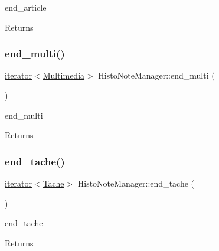 end\+\_\+article 

\begin{DoxyReturn}{Returns}

\end{DoxyReturn}
\mbox{\label{class_histo_note_manager_a06d66890cadc6e9943ef3b073b5d6203}} 
\subsubsection{\texorpdfstring{end\+\_\+multi()}{end\_multi()}}
{\footnotesize\ttfamily \hyperlink{class_histo_note_manager_1_1iterator}{iterator}$<$\hyperlink{class_multimedia}{Multimedia}$>$ Histo\+Note\+Manager\+::end\+\_\+multi (\begin{DoxyParamCaption}{ }\end{DoxyParamCaption})\hspace{0.3cm}{\ttfamily [inline]}}



end\+\_\+multi 

\begin{DoxyReturn}{Returns}

\end{DoxyReturn}
\mbox{\label{class_histo_note_manager_a2c0ed9638820a52fcdd60d10c0257607}} 
\subsubsection{\texorpdfstring{end\+\_\+tache()}{end\_tache()}}
{\footnotesize\ttfamily \hyperlink{class_histo_note_manager_1_1iterator}{iterator}$<$\hyperlink{class_tache}{Tache}$>$ Histo\+Note\+Manager\+::end\+\_\+tache (\begin{DoxyParamCaption}{ }\end{DoxyParamCaption})\hspace{0.3cm}{\ttfamily [inline]}}



end\+\_\+tache 

\begin{DoxyReturn}{Returns}

\end{DoxyReturn}
\mbox{\label{class_histo_note_manager_a20b1ac0b28a181af8320d311f6284743}} 
